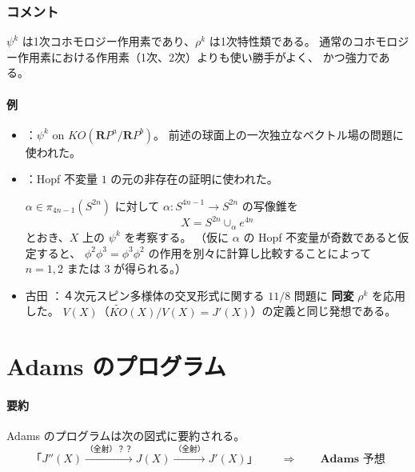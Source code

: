 \documentclass[uplatex,dvipdfmx,a4paper,12pt]{jlreq}
\begin{document}
\subsubsection{コメント}

$\psi^k$ は1次コホモロジー作用素であり、$\rho^k$ は1次特性類である。
通常のコホモロジー作用素における作用素（1次、2次）よりも使い勝手がよく、
かつ強力である。

\paragraph{例}
\begin{itemize}
  \item \cite{Ad62}：$\psi^k$ on $KO(\mathbf{R}P^a / \mathbf{R}P^b)$。
        前述の球面上の一次独立なベクトル場の問題に使われた。
  \item \cite{AdAt66}：Hopf 不変量 $1$ の元の非存在の証明に使われた。

        $\alpha \in \pi_{4n-1}(S^{2n})$ に対して
        $\alpha : S^{4n-1} \to S^{2n}$ の写像錐を
        \[
          X = S^{2n} \cup_\alpha e^{4n}
        \]
        とおき、$X$ 上の $\psi^k$ を考察する。
        （仮に $\alpha$ の Hopf 不変量が奇数であると仮定すると、
        $\phi^2 \phi^3 = \phi^3 \phi^2$ の作用を別々に計算し比較することによって
        $n = 1, 2$ または $3$ が得られる。）

  \item 古田 \cite{F}：４次元スピン多様体の交叉形式に関する $11/8$ 問題に
        \textbf{同変} $\rho^k$ を応用した。
        $V(X)$（$\widetilde{KO}(X)/V(X) = J'(X)$）の定義と同じ発想である。
\end{itemize}

\section{Adams のプログラム}

\paragraph{要約}

Adams のプログラムは次の図式に要約される。
\[
  \text{「} J''(X)
  \stackrel{\text{（全射）？？}}{\longrightarrow} J(X)
  \stackrel{\text{（全射）}}{\longrightarrow} J'(X) \text{」}
  \qquad \Longrightarrow \qquad \textbf{Adams 予想}
\]
\end{document}
